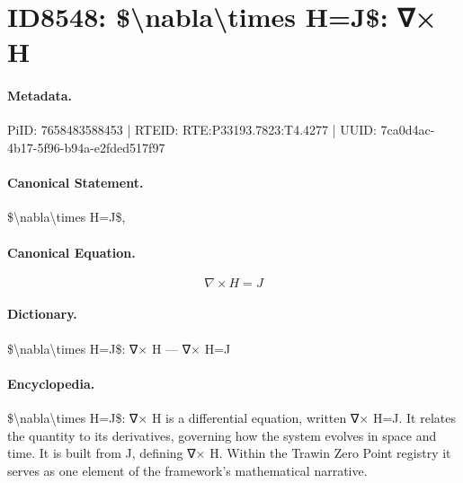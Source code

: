 \section*{ID8548: \$\textbackslash{}nabla\textbackslash{}times H=J\$: ∇× H}
\paragraph{Metadata.}
PiID: 7658483588453 | RTEID: RTE:P33193.7823:T4.4277 | UUID: 7ca0d4ac-4b17-5f96-b94a-e2fded517f97

\paragraph{Canonical Statement.}
\$\textbackslash{}nabla\textbackslash{}times H=J\$,

\paragraph{Canonical Equation.}
\[
\nabla\times H=J
\]

\paragraph{Dictionary.}
\$\textbackslash{}nabla\textbackslash{}times H=J\$: ∇× H — ∇× H=J

\paragraph{Encyclopedia.}
\$\textbackslash{}nabla\textbackslash{}times H=J\$: ∇× H is a differential equation, written ∇× H=J. It relates the quantity to its derivatives, governing how the system evolves in space and time. It is built from J, defining ∇× H. Within the Trawin Zero Point registry it serves as one element of the framework's mathematical narrative.
